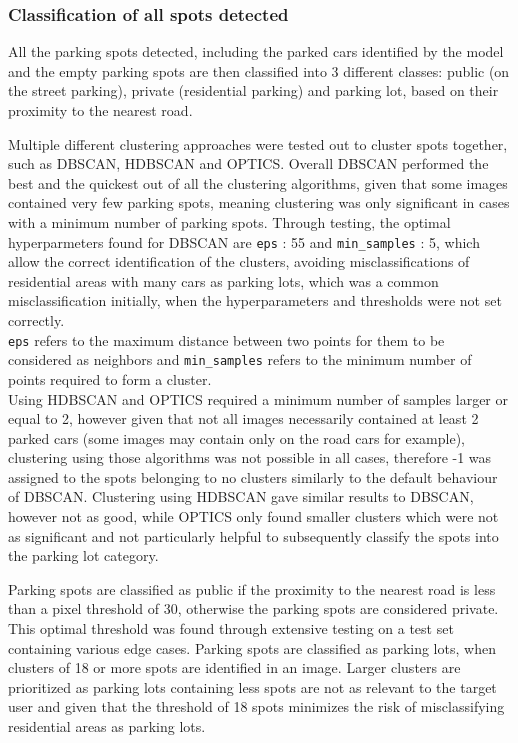 \newpage

\subsubsection{Classification of all spots detected}
All the parking spots detected, including the parked cars identified by the model and the empty parking spots are then classified into 3 different classes: public (on the street parking), private (residential parking) and parking lot, based on their proximity to the nearest road.

Multiple different clustering approaches were tested out to cluster spots together, such as DBSCAN, HDBSCAN and OPTICS.
Overall DBSCAN performed the best and the quickest out of all the clustering algorithms, given that some images contained very few parking spots, meaning clustering was only significant in cases with a minimum number of parking spots.
Through testing, the optimal hyperparmeters found for DBSCAN are \texttt{eps} : 55 and \texttt{min\_samples} : 5, which allow the correct identification of the clusters, avoiding misclassifications of residential areas with many cars as parking lots, which was a common misclassification initially, when the hyperparameters and thresholds were not set correctly.\\
\texttt{eps} refers to the maximum distance between two points for them to be considered as neighbors and \texttt{min\_samples} refers to the minimum number of points required to form a cluster.\\
Using HDBSCAN and OPTICS required a minimum number of samples larger or equal to 2, however given that not all images necessarily contained at least 2 parked cars (some images may contain only on the road cars for example), clustering using those algorithms was not possible in all cases, therefore -1 was assigned to the spots belonging to no clusters similarly to the default behaviour of DBSCAN.
Clustering using HDBSCAN gave similar results to DBSCAN, however not as good, while OPTICS only found smaller clusters which were not as significant and not particularly helpful to subsequently classify the spots into the parking lot category.

Parking spots are classified as public if the proximity to the nearest road is less than a pixel threshold of 30, otherwise the parking spots are considered private. This optimal threshold was found through extensive testing on a test set containing various edge cases.
Parking spots are classified as parking lots, when clusters of 18 or more spots are identified in an image. Larger clusters are prioritized as parking lots containing less spots are not as relevant to the target user and given that the threshold of 18 spots minimizes the risk of misclassifying residential areas as parking lots.

